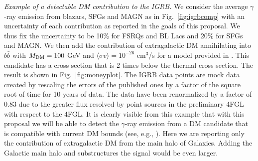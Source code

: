 \documentclass[12 pt]{article}
\begin{document}
{\it Example of a detectable DM contribution to the IGRB.}
We consider the average $\gamma$-ray emission from blazars, SFGs and MAGN as in Fig.~\ref{fig:igrbcomp} with an uncertainty of each contribution as reported in the goals of this proposal. We thus fix the uncertainty to be 10\% for FSRQs and BL Lacs and 20\% for SFGs and MAGN.
We then add the contribution of extragalactic DM annihilating into $b\bar{b}$ with $M_{\rm{DM}}=100$ GeV and $\langle \sigma v \rangle = 10^{-26}$ cm$^3$/s for a model provided in \cite{Cirelli:2010xx}. 
This candidate has a cross section that is 2 times below the thermal cross section.
The result is shown in Fig.~\ref{fig:moneyplot}. The IGRB data points are mock data created by rescaling the errors of the published ones \cite{Ackermann:2014usa} by a factor of the square root of time for 10 years of data. The data have been renormalized by a factor of 0.83 due to the greater flux resolved by point sources in the preliminary 4FGL with respect to the 4FGL.
It is clearly visible from this example that with this proposal we will be able to detect the $\gamma$-ray emission from a DM candidate that is compatible with current DM bounds (see, e.g., \cite{Fermi-LAT:2016uux}). Here we are reporting only the contribution of extragalactic DM from the main halo of Galaxies. Adding the Galactic main halo and substructures the signal would be even larger.



\end{document}
